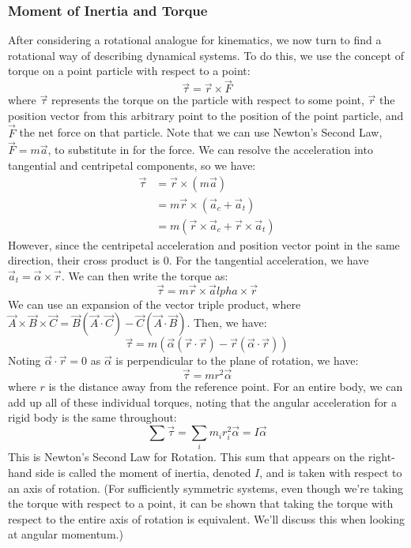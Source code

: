 \subsubsection{Moment of Inertia and Torque}
After considering a rotational analogue for kinematics, we now turn to find a rotational way of describing dynamical systems. To do this, we use the concept of torque on a point particle with respect to a point: 
\[
	\vec \tau = \vec r \times \vec F
\]
where $\vec \tau$ represents the torque on the particle with respect to some point, $\vec r$ the position vector from this arbitrary point to the position of the point particle, and $\vec F$ the net force on that particle. Note that we can use Newton's Second Law, $\vec F = m\vec a$, to substitute in for the force. We can resolve the acceleration into tangential and centripetal components, so we have: 
\begin{align*}
	\vec \tau &= \vec r \times (m \vec a) \\
	&= m \vec r \times (\vec a_c + \vec a_t) \\
	&= m (\vec r \times \vec a_c + \vec r \times \vec a_t) 
\end{align*}
However, since the centripetal acceleration and position vector point in the same direction, their cross product is $0$. For the tangential acceleration, we have $\vec a_t = \vec \alpha \times \vec r$. We can then write the torque as:
\[
	\vec \tau = m \vec r \times \vec alpha \times \vec r
\] 
We can use an expansion of the vector triple product, where $\vec A \times \vec B \times \vec C = \vec B(\vec A \cdot \vec C) - \vec C(\vec A \cdot \vec B)$. Then, we have:
\[
	\vec \tau = m(\vec \alpha (\vec r \cdot \vec r) - \vec r(\vec \alpha \cdot \vec r))
\] 
Noting $\vec \alpha \cdot \vec r = 0$ as $\vec \alpha$ is perpendicular to the plane of rotation, we have:
\[
	\vec \tau = mr^2 \vec \alpha
\]
where $r$ is the distance away from the reference point. For an entire body, we can add up all of these individual torques, noting that the angular acceleration for a rigid body is the same throughout:
\[
	\sum \vec \tau = \sum_i m_i r_i^2 \vec \alpha = I \vec \alpha
\]
This is Newton's Second Law for Rotation. This sum that appears on the right-hand side is called the moment of inertia, denoted $I$, and is taken with respect to an axis of rotation. (For sufficiently symmetric systems, even though we're taking the torque with respect to a point, it can be shown that taking the torque with respect to the entire axis of rotation is equivalent. We'll discuss this when looking at angular momentum.) \\

